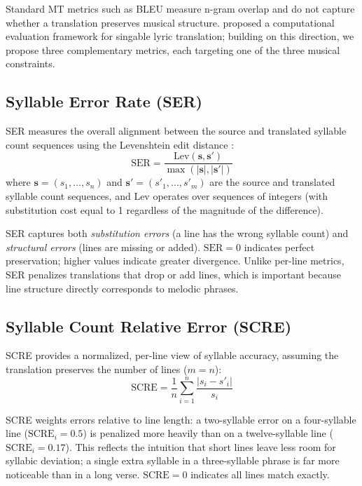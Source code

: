 \documentclass[11pt]{article}
\begin{document}
Standard MT metrics such as BLEU measure n-gram overlap and do not capture whether a translation preserves musical structure.
\citet{kim-etal-2023-computational} proposed a computational evaluation framework for singable lyric translation; building on this direction, we propose three complementary metrics, each targeting one of the three musical constraints.

\subsection{Syllable Error Rate (SER)}

SER measures the overall alignment between the source and translated syllable count sequences using the Levenshtein edit distance \citep{levenshtein-1966}:
\begin{equation}
    \text{SER} = \frac{\text{Lev}(\mathbf{s}, \mathbf{s}')}{\max(|\mathbf{s}|, |\mathbf{s}'|)}
\end{equation}
where $\mathbf{s} = (s_1, \ldots, s_n)$ and $\mathbf{s}' = (s'_1, \ldots, s'_m)$ are the source and translated syllable count sequences, and $\text{Lev}$ operates over sequences of integers (with substitution cost equal to 1 regardless of the magnitude of the difference).

SER captures both \emph{substitution errors} (a line has the wrong syllable count) and \emph{structural errors} (lines are missing or added).
$\text{SER} = 0$ indicates perfect preservation; higher values indicate greater divergence.
Unlike per-line metrics, SER penalizes translations that drop or add lines, which is important because line structure directly corresponds to melodic phrases.

\subsection{Syllable Count Relative Error (SCRE)}

SCRE provides a normalized, per-line view of syllable accuracy, assuming the translation preserves the number of lines ($m = n$):
\begin{equation}
    \text{SCRE} = \frac{1}{n} \sum_{i=1}^{n} \frac{|s_i - s'_i|}{s_i}
\end{equation}

SCRE weights errors relative to line length: a two-syllable error on a four-syllable line ($\text{SCRE}_i = 0.5$) is penalized more heavily than on a twelve-syllable line ($\text{SCRE}_i = 0.17$).
This reflects the intuition that short lines leave less room for syllabic deviation; a single extra syllable in a three-syllable phrase is far more noticeable than in a long verse.
$\text{SCRE} = 0$ indicates all lines match exactly.
\end{document}
